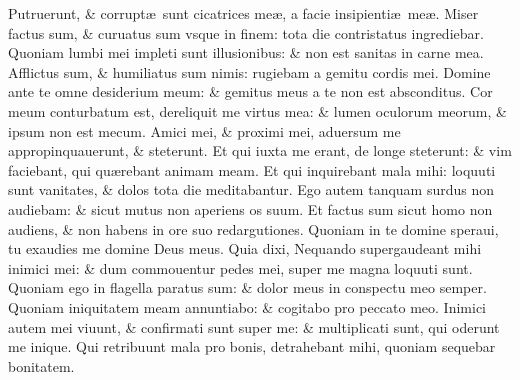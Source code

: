 \documentclass[a5paper,10pt]{book}
\def\ae{æ}
\begin{document}
\begin{multicols*}{2}
\newline \color{red} P\color{black}utruerunt, \& corrupt\ae \ sunt cicatrices me\ae , a facie insipienti\ae \ me\ae .
\newline \color{red} M\color{black}iser factus sum, \& curuatus sum vsque in finem: tota die contristatus ingrediebar.
\newline \color{red} Q\color{black}uoniam lumbi mei impleti sunt illusionibus: \& non est sanitas in carne mea.
\newline \color{red} A\color{black}fflictus sum, \& humiliatus sum nimis: rugiebam a gemitu cordis mei.
\newline \color{red} D\color{black}omine ante te omne desiderium meum: \& gemitus meus a te non est absconditus.
\newline \color{red} C\color{black}or meum conturbatum est, dereliquit me virtus mea: \& lumen oculorum meorum, \& ipsum non est mecum.
\newline \color{red} A\color{black}mici mei, \& proximi mei, aduersum me appropinquauerunt, \& steterunt.
\newline \color{red} E\color{black}t qui iuxta me erant, de longe steterunt: \& vim faciebant, qui qu\ae rebant animam meam.
\newline \color{red} E\color{black}t qui inquirebant mala mihi: loquuti sunt vanitates, \& dolos tota die meditabantur.
\newline \color{red} E\color{black}go autem tanquam surdus non audiebam: \& sicut mutus non aperiens os suum.
\newline \color{red} E\color{black}t factus sum sicut homo non audiens, \& non habens in ore suo redargutiones.
\newline \color{red} Q\color{black}uoniam in te domine speraui, tu exaudies me domine Deus meus.
\newline \color{red} Q\color{black}uia dixi, Nequando supergaudeant mihi inimici mei: \& dum commouentur pedes mei, super me magna loquuti sunt.
\newline \color{red} Q\color{black}uoniam ego in flagella paratus sum: \& dolor meus in conspectu meo semper.
\newline \color{red} Q\color{black}uoniam iniquitatem meam annuntiabo: \& cogitabo pro peccato meo.
\newline \color{red} I\color{black}nimici autem mei viuunt, \& confirmati sunt super me: \& multiplicati sunt, qui oderunt me inique.
\newline \color{red} Q\color{black}ui retribuunt mala pro bonis, detrahebant mihi, quoniam sequebar bonitatem.

\end{multicols*}
\end{document}

